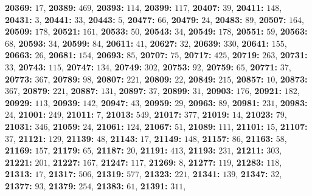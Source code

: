 \textsf{\bfseries 20369:} $17$, \textsf{\bfseries 20389:} $469$, \textsf{\bfseries 20393:} $114$, \textsf{\bfseries 20399:} $117$, \textsf{\bfseries 20407:} $39$, \textsf{\bfseries 20411:} $148$, \textsf{\bfseries 20431:} $3$, \textsf{\bfseries 20441:} $33$, \textsf{\bfseries 20443:} $5$, \textsf{\bfseries 20477:} $66$, \textsf{\bfseries 20479:} $24$, \textsf{\bfseries 20483:} $89$, \textsf{\bfseries 20507:} $164$, \textsf{\bfseries 20509:} $178$, \textsf{\bfseries 20521:} $161$, \textsf{\bfseries 20533:} $50$, \textsf{\bfseries 20543:} $34$, \textsf{\bfseries 20549:} $178$, \textsf{\bfseries 20551:} $59$, \textsf{\bfseries 20563:} $68$, \textsf{\bfseries 20593:} $34$, \textsf{\bfseries 20599:} $84$, \textsf{\bfseries 20611:} $41$, \textsf{\bfseries 20627:} $32$, \textsf{\bfseries 20639:} $330$, \textsf{\bfseries 20641:} $155$, \textsf{\bfseries 20663:} $26$, \textsf{\bfseries 20681:} $154$, \textsf{\bfseries 20693:} $85$, \textsf{\bfseries 20707:} $75$, \textsf{\bfseries 20717:} $425$, \textsf{\bfseries 20719:} $263$, \textsf{\bfseries 20731:} $33$, \textsf{\bfseries 20743:} $115$, \textsf{\bfseries 20747:} $134$, \textsf{\bfseries 20749:} $302$, \textsf{\bfseries 20753:} $92$, \textsf{\bfseries 20759:} $65$, \textsf{\bfseries 20771:} $37$, \textsf{\bfseries 20773:} $367$, \textsf{\bfseries 20789:} $98$, \textsf{\bfseries 20807:} $221$, \textsf{\bfseries 20809:} $22$, \textsf{\bfseries 20849:} $215$, \textsf{\bfseries 20857:} $10$, \textsf{\bfseries 20873:} $367$, \textsf{\bfseries 20879:} $221$, \textsf{\bfseries 20887:} $131$, \textsf{\bfseries 20897:} $37$, \textsf{\bfseries 20899:} $31$, \textsf{\bfseries 20903:} $176$, \textsf{\bfseries 20921:} $182$, \textsf{\bfseries 20929:} $113$, \textsf{\bfseries 20939:} $142$, \textsf{\bfseries 20947:} $43$, \textsf{\bfseries 20959:} $29$, \textsf{\bfseries 20963:} $89$, \textsf{\bfseries 20981:} $231$, \textsf{\bfseries 20983:} $24$, \textsf{\bfseries 21001:} $249$, \textsf{\bfseries 21011:} $7$, \textsf{\bfseries 21013:} $549$, \textsf{\bfseries 21017:} $377$, \textsf{\bfseries 21019:} $14$, \textsf{\bfseries 21023:} $79$, \textsf{\bfseries 21031:} $346$, \textsf{\bfseries 21059:} $24$, \textsf{\bfseries 21061:} $124$, \textsf{\bfseries 21067:} $51$, \textsf{\bfseries 21089:} $111$, \textsf{\bfseries 21101:} $15$, \textsf{\bfseries 21107:} $37$, \textsf{\bfseries 21121:} $129$, \textsf{\bfseries 21139:} $48$, \textsf{\bfseries 21143:} $17$, \textsf{\bfseries 21149:} $148$, \textsf{\bfseries 21157:} $86$, \textsf{\bfseries 21163:} $58$, \textsf{\bfseries 21169:} $157$, \textsf{\bfseries 21179:} $65$, \textsf{\bfseries 21187:} $20$, \textsf{\bfseries 21191:} $413$, \textsf{\bfseries 21193:} $231$, \textsf{\bfseries 21211:} $303$, \textsf{\bfseries 21221:} $201$, \textsf{\bfseries 21227:} $167$, \textsf{\bfseries 21247:} $117$, \textsf{\bfseries 21269:} $8$, \textsf{\bfseries 21277:} $119$, \textsf{\bfseries 21283:} $118$, \textsf{\bfseries 21313:} $17$, \textsf{\bfseries 21317:} $506$, \textsf{\bfseries 21319:} $577$, \textsf{\bfseries 21323:} $221$, \textsf{\bfseries 21341:} $139$, \textsf{\bfseries 21347:} $32$, \textsf{\bfseries 21377:} $93$, \textsf{\bfseries 21379:} $254$, \textsf{\bfseries 21383:} $61$, \textsf{\bfseries 21391:} $311$, 
